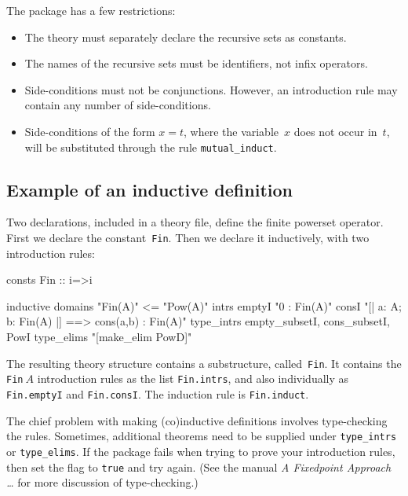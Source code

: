 The package has a few restrictions:
\begin{itemize}
\item The theory must separately declare the recursive sets as
  constants.

\item The names of the recursive sets must be identifiers, not infix
operators.  

\item Side-conditions must not be conjunctions.  However, an introduction rule
may contain any number of side-conditions.

\item Side-conditions of the form $x=t$, where the variable~$x$ does not
  occur in~$t$, will be substituted through the rule \verb|mutual_induct|.
\end{itemize}


\subsection{Example of an inductive definition}

Two declarations, included in a theory file, define the finite powerset
operator.  First we declare the constant~\texttt{Fin}.  Then we declare it
inductively, with two introduction rules:
\begin{ttbox}
consts  Fin :: i=>i

inductive
  domains   "Fin(A)" <= "Pow(A)"
  intrs
    emptyI  "0 : Fin(A)"
    consI   "[| a: A;  b: Fin(A) |] ==> cons(a,b) : Fin(A)"
  type_intrs empty_subsetI, cons_subsetI, PowI
  type_elims "[make_elim PowD]"
\end{ttbox}
The resulting theory structure contains a substructure, called~\texttt{Fin}.
It contains the \texttt{Fin}$~A$ introduction rules as the list
\texttt{Fin.intrs}, and also individually as \texttt{Fin.emptyI} and
\texttt{Fin.consI}.  The induction rule is \texttt{Fin.induct}.

The chief problem with making (co)inductive definitions involves type-checking
the rules.  Sometimes, additional theorems need to be supplied under
\texttt{type_intrs} or \texttt{type_elims}.  If the package fails when trying
to prove your introduction rules, then set the flag 
to \texttt{true} and try again.  (See the manual \emph{A Fixedpoint Approach
  \ldots} for more discussion of type-checking.)

